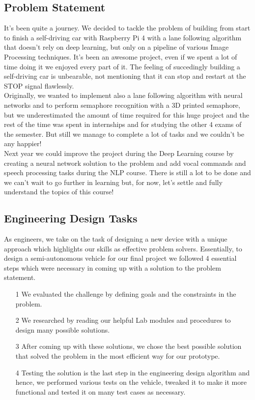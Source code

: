 \documentclass[12pt,a4paper]{article}
\begin{document}
\subsection{Problem Statement}
\begin{large}
It's been quite a journey. We decided to tackle the problem of building from start to finish a self-driving car with Raspberry Pi 4 with a lane following algorithm that doesn't rely on deep learning, but only on a pipeline of various Image Processing techniques. It's been an awesome project, even if we spent a lot of time doing it we enjoyed every part of it. The feeling of succedingly building a self-driving car is unbearable, not mentioning that it can stop and restart at the STOP signal flawlessly. \\
Originally, we wanted to implement also a lane following algorithm with neural networks and to perform semaphore recognition with a 3D printed semaphore, but we underestimated the amount of time required for this huge project and the rest of the time was spent in internships and for studying the other 4 exams of the semester. But still we manage to complete a lot of tasks and we couldn't be any happier! \\
Next year we could improve the project during the Deep Learning course by creating a neural network solution to the problem and add vocal commands and speech processing tasks during the NLP course. There is still a lot to be done and we can't wait to go further in learning but, for now, let's settle and fully understand the topics of this course!
\subsection{Engineering Design Tasks}
As engineers, we take on the task of designing a new device with a unique approach which highlights our skills as effective problem solvers. Essentially, to design a semi-autonomous vehicle for our final project we followed 4 essential steps which were necessary in coming up with a solution to the problem statement. 

\begin{itemize}
\item[1] We evaluated the challenge by defining goals and the constraints in the problem.
\item[2] We researched by reading our helpful Lab modules and procedures to design many possible solutions.
\item[3] After coming up with these solutions, we chose the best possible solution that solved the problem in the most efficient way for our prototype.
\item[4] Testing the solution is the last step in the engineering design algorithm and hence, we performed various tests on the vehicle, tweaked it to make it more functional and tested it on many test cases as necessary. 
\end{itemize}
\newpage


\end{large}
\end{document}

